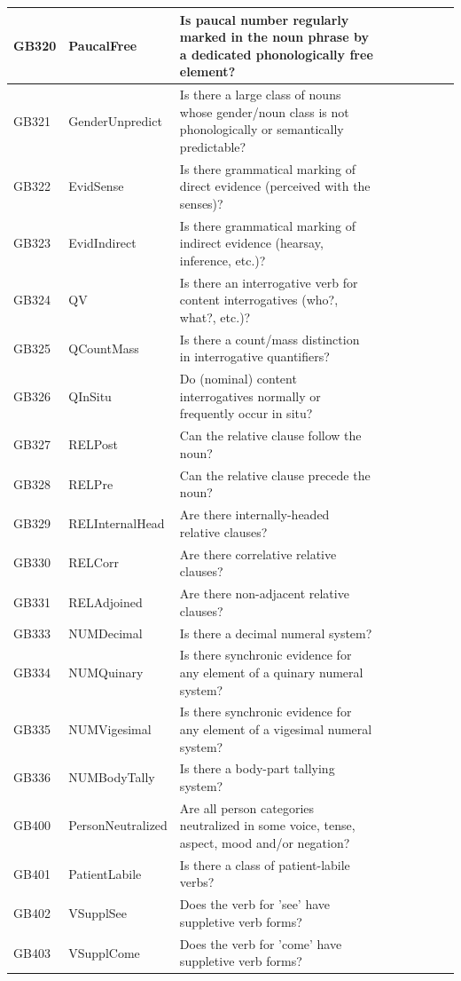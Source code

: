 \documentclass[a4paper,10pt]{article} %
\begin{document}
\begin{landscape}
\begin{longtable}{| l | p{4cm}| p{12cm}|p{2cm}|p{2cm}|p{2cm}|p{2cm}|p{2cm}|p{2cm}|}
GB320 & PaucalFree&Is paucal number regularly marked in the noun phrase by a dedicated phonologically free element?\\ \hline
GB321 & GenderUnpredict&Is there a large class of nouns whose gender/noun class is not phonologically or semantically predictable?\\ \hline
GB322 & EvidSense&Is there grammatical marking of direct evidence (perceived with the senses)?\\ \hline
GB323 & EvidIndirect&Is there grammatical marking of indirect evidence (hearsay, inference, etc.)?\\ \hline
GB324 & QV&Is there an interrogative verb for content interrogatives (who?, what?, etc.)?\\ \hline
GB325 & QCountMass&Is there a count/mass distinction in interrogative quantifiers?\\ \hline
GB326 & QInSitu&Do (nominal) content interrogatives normally or frequently occur in situ?\\ \hline
GB327 & RELPost&Can the relative clause follow the noun?\\ \hline
GB328 & RELPre&Can the relative clause precede the noun?\\ \hline
GB329 & RELInternalHead&Are there internally-headed relative clauses?\\ \hline
GB330 & RELCorr&Are there correlative relative clauses?\\ \hline
GB331 & RELAdjoined&Are there non-adjacent relative clauses?\\ \hline
GB333 & NUMDecimal&Is there a decimal numeral system?\\ \hline
GB334 & NUMQuinary&Is there synchronic evidence for any element of a quinary numeral system?\\ \hline
GB335 & NUMVigesimal&Is there synchronic evidence for any element of a vigesimal numeral system?\\ \hline
GB336 & NUMBodyTally&Is there a body-part tallying system?\\ \hline
GB400 & PersonNeutralized&Are all person categories neutralized in some voice, tense, aspect, mood and/or negation?\\ \hline
GB401 & PatientLabile&Is there a class of patient-labile verbs?\\ \hline
GB402 & VSupplSee&Does the verb for 'see' have suppletive verb forms?\\ \hline
GB403 & VSupplCome&Does the verb for 'come' have suppletive verb forms?\\ \hline

\end{longtable}
\end{landscape}
\end{document}
